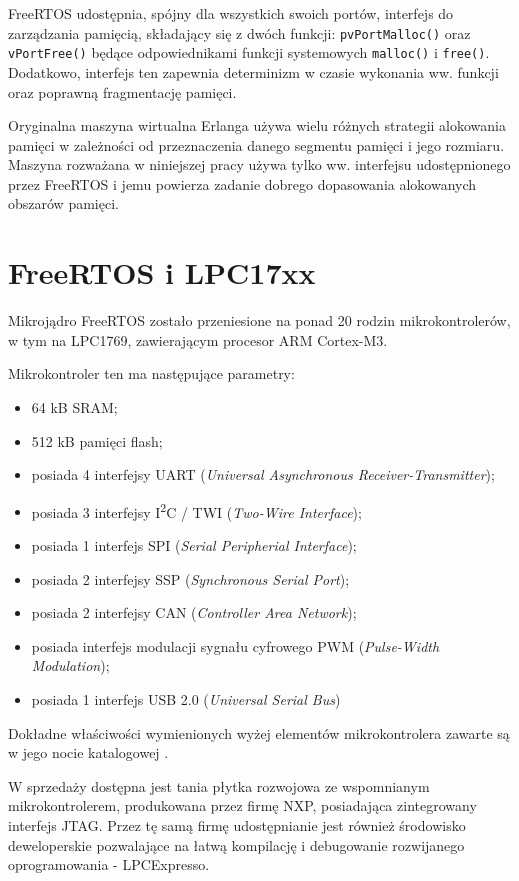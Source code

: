 FreeRTOS udostępnia, spójny dla wszystkich swoich portów, interfejs do zarządzania pamięcią, składający się z dwóch funkcji: \texttt{pvPortMalloc()} oraz \texttt{vPortFree()} będące odpowiednikami funkcji systemowych \texttt{malloc()} i \texttt{free()}. Dodatkowo, interfejs ten zapewnia determinizm w czasie wykonania ww. funkcji oraz poprawną fragmentację pamięci.

Oryginalna maszyna wirtualna Erlanga używa wielu różnych strategii alokowania pamięci w zależności od przeznaczenia danego segmentu pamięci i jego rozmiaru. Maszyna rozważana w niniejszej pracy używa tylko ww. interfejsu udostępnionego przez FreeRTOS i jemu powierza zadanie dobrego dopasowania alokowanych obszarów pamięci.

\section{FreeRTOS i LPC17xx}
\label{sec:rtosLPC}

Mikrojądro FreeRTOS zostało przeniesione na ponad 20 rodzin mikrokontrolerów, w tym na LPC1769, zawierającym procesor ARM Cortex-M3.

Mikrokontroler ten ma następujące parametry:
\begin{itemize}
\item 64 kB SRAM;
\item 512 kB pamięci flash;
\item posiada 4 interfejsy UART (\emph{Universal Asynchronous Receiver-Transmitter});
\item posiada 3 interfejsy I\textsuperscript{2}C / TWI (\emph{Two-Wire Interface});
\item posiada 1 interfejs SPI (\emph{Serial Peripherial Interface});
\item posiada 2 interfejsy SSP (\emph{Synchronous Serial Port});
\item posiada 2 interfejsy CAN (\emph{Controller Area Network});
\item posiada interfejs modulacji sygnału cyfrowego PWM (\emph{Pulse-Width Modulation});
\item posiada 1 interfejs USB 2.0 (\emph{Universal Serial Bus})
\end{itemize}

Dokładne właściwości wymienionych wyżej elementów mikrokontrolera zawarte są w jego nocie katalogowej \cite{NXP2014}.

W sprzedaży dostępna jest tania płytka rozwojowa ze wspomnianym mikrokontrolerem, produkowana przez firmę NXP, posiadająca zintegrowany interfejs JTAG. Przez tę samą firmę udostępnianie jest również środowisko deweloperskie pozwalające na łatwą kompilację i debugowanie rozwijanego oprogramowania - LPCExpresso.

